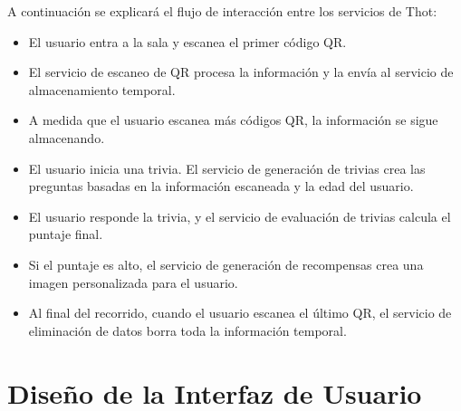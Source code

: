 \documentclass{report}
\begin{document}
A continuación se explicará el flujo de interacción entre los servicios de Thot:
\begin{itemize}
    \item El usuario entra a la sala y escanea el primer código QR.
    \item El servicio de escaneo de QR procesa la información y la envía al servicio de almacenamiento temporal.
    \item A medida que el usuario escanea más códigos QR, la información se sigue almacenando.
    \item El usuario inicia una trivia. El servicio de generación de trivias crea las preguntas basadas en la información escaneada y la edad del usuario.
    \item El usuario responde la trivia, y el servicio de evaluación de trivias calcula el puntaje final.
    \item Si el puntaje es alto, el servicio de generación de recompensas crea una imagen personalizada para el usuario.
    \item Al final del recorrido, cuando el usuario escanea el último QR, el servicio de eliminación de datos borra toda la información temporal.
\end{itemize}

\section{Diseño de la Interfaz de Usuario}
\end{document}
